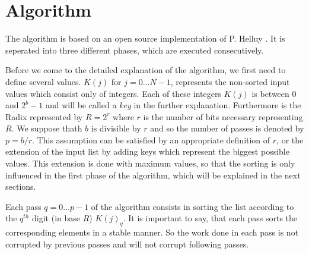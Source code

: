 \documentclass{llncs}
\title{\doctype}
\author{Hennadiy Yatskov\\ Nico Mürdter}
\institute{
Karlsruhe Institute of Technology, Karlsruhe, Germany\\
\email{hennadiy.yatskov@student.kit.edu\\ nico.muerdter@student.kit.edu}}
\begin{document}

\def\iterationcnt{5}

\maketitle

\begin{abstract}
TODO
\end{abstract}

\pagestyle{plain}

\section{Algorithm}
The algorithm is based on an open source implementation of P. Helluy \cite{ocl-radix-helluy}. It is seperated into three different phases, which are executed consecutively.

Before we come to the detailed explanation of the algorithm, we first need to define several values. $K(j)$ for $j=0 \dots N-1$, represents the non-sorted input values which consist only of integers. Each of these integers $K(j)$ is between $0$ and $2^b - 1$ and will be called a \textit{key} in the further explanation. Furthermore is the Radix represented by $R = 2^r$ where $r$ is the number of bits necessary representing $R$. We suppose thath $b$ is divisible by $r$ and so the number of passes is denoted by $p = b/r$. This assumption can be satisfied by an appropriate definition of $r$, or the extension of the input list by adding keys which represent the biggest possible values. This extension is done with maximum values, so that the sorting is only influenced in the first phase of the algorithm, which will be explained in the next sections.


Each pass $q=0 \dots p-1$ of the algorithm consists in sorting the list according to the $q^{th}$ digit (in base $R$) $K(j)_q$. It is important to say, that each pass sorts the corresponding elements in a stable manner. So the work done in each pass is not corrupted by previous passes and will not corrupt following passes.
\end{document}
